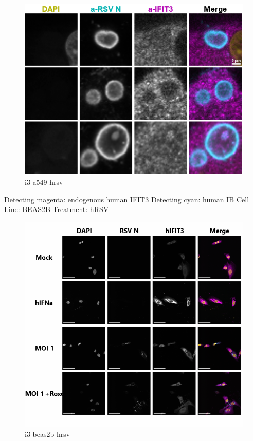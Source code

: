 \begin{figure}
    \centering
    \includegraphics[width=1\linewidth]{09. Chapter 4/Figs/02. Infection/04. a549 i3.png}
    \caption[i3 a549 hrsv]{i3 a549 hrsv}
    \label{fig:i3 a549 hrsv}
\end{figure}

Detecting magenta: endogenous human IFIT3 \newline
Detecting cyan: human IB \newline
Cell Line: BEAS2B \newline
Treatment: hRSV \newline

\begin{figure}
    \centering
    \includegraphics[width=1\linewidth]{09. Chapter 4/Figs/02. Infection/05. beas2b i3.png}
    \caption[i3 beas2b hrsv]{i3 beas2b hrsv}
    \label{fig:i3 beas2b hrsv}
\end{figure}

